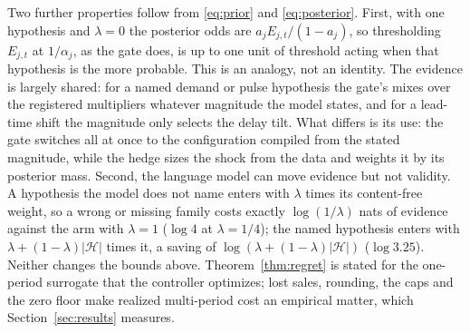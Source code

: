 Two further properties follow from \eqref{eq:prior} and \eqref{eq:posterior}.
First, with one hypothesis and $\lambda = 0$ the posterior odds are
$a_j E_{j,t}/(1-a_j)$, so thresholding $E_{j,t}$ at $1/\alpha_j$, as the gate
does, is up to one unit of threshold acting when that hypothesis is the more
probable. This is an analogy, not an identity. The evidence is largely shared: for a
named demand or pulse hypothesis the gate's \eprocess{} mixes over the registered
multipliers whatever magnitude the model states, and for a lead-time shift the
magnitude only selects the delay tilt. What differs is its use: the gate switches all
at once to the configuration compiled from the stated magnitude, while the hedge sizes
the shock from the data and weights it by its posterior mass. Second, the language model can move evidence but not
validity. A hypothesis the model does not name enters with $\lambda$ times its
content-free weight, so a wrong or missing family costs exactly
$\log(1/\lambda)$ nats of evidence against the arm with $\lambda = 1$ ($\log 4$
at $\lambda = 1/4$); the named hypothesis enters with
$\lambda + (1-\lambda)|\mathcal{H}|$ times it, a saving of
$\log(\lambda + (1-\lambda)|\mathcal{H}|)$ ($\log 3.25$). Neither changes the
bounds above. Theorem~\ref{thm:regret} is stated for the one-period surrogate that
the controller optimizes; lost sales, rounding, the caps and the zero floor make
realized multi-period cost an empirical matter, which Section~\ref{sec:results}
measures.
